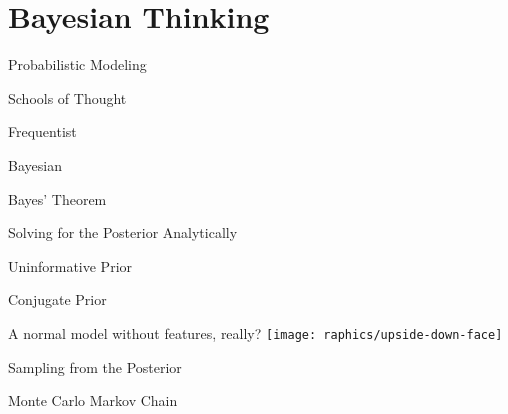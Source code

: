 \section{Bayesian Thinking}

\begin{frame}{Probabilistic Modeling}
\end{frame}

\begin{frame}{Schools of Thought}
\end{frame}

\begin{frame}{Frequentist}
\end{frame}

\begin{frame}{Bayesian}
\end{frame}

\begin{frame}{Bayes' Theorem}
\end{frame}

\begin{frame}{Solving for the Posterior Analytically}
\end{frame}

\begin{frame}{Uninformative Prior}
\end{frame}

\begin{frame}{Conjugate Prior}
\end{frame}

\begin{frame}
  \vfill
  \centering
  \Large A normal model without features, really?
  \texttt{[image: raphics/upside-down-face]}
  \vfill
\end{frame}

\begin{frame}{Sampling from the Posterior}
\end{frame}

\begin{frame}{Monte Carlo Markov Chain}
\end{frame}
